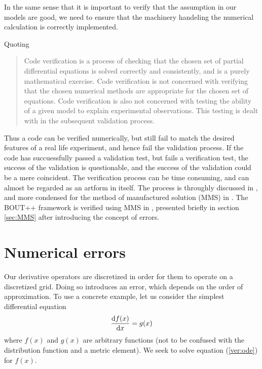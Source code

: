 In the same sense that it is important to verify that the assumption in our models are good, we need to ensure that the machinery handeling the numerical calculation is correctly implemented.

Quoting \cite{Dudson2016}

\blockquote{
Code verification is a process of checking that the chosen set of partial differential equations is solved correctly and consistently, and is a purely mathematical exercise.
Code verification is not concerned with verifying that the chosen numerical methods are appropriate for the chosen set of equations.
Code verification is also not concerned with testing the ability of a given model to explain experimental observations.
This testing is dealt with in the subsequent validation process.
}

Thus a code can be verified numerically, but still fail to match the desired features of a real life experiment, and hence fail the validation process.
If the code has succuessfully passed a validation test, but fails a verification test, the success of the validation is questionable, and the success of the validation could be a mere coincident.
The verification process can be time consuming, and can almost be regarded as an artform in itself.
The process is throughly discussed in \cite{Oberkampf2010book}, and more condensed for the method of manufactured solution (MMS) in \cite{Salari}.
The BOUT++ framework is verified using MMS in \cite{Dudson2016}, presented briefly in section \ref{sec:MMS} after introducing the concept of errors.

\section{Numerical errors}
%
Our derivative operators are discretized in order for them to operate on a discretized grid.
Doing so introduces an error, which depends on the order of approximation.
To use a concrete example, let us consider the simplest differential equation
%
\begin{align}
    \frac{\text{d}{f(x)}}{\text{d}{x}} = g(x)
    \label{ver:ode}
\end{align}
%
where $f(x)$ and $g(x)$ are arbitrary functions (not to be confused with the distribution function and a metric element).
We seek to solve equation (\ref{ver:ode}) for $f(x)$.

